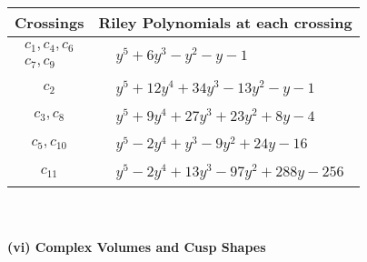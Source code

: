 \documentclass[1p]{elsarticle_modified}
\theoremstyle{definition}
\begin{document}
\begin{tabular}{m{50pt}|m{274pt}}
Crossings & \hspace{64pt}Riley Polynomials at each crossing \\
\hline $$\begin{aligned}c_{1},c_{4},c_{6}\\c_{7},c_{9}\end{aligned}$$&$\begin{aligned}
&y^5+6 y^3- y^2- y-1
\end{aligned}$\\
\hline $$\begin{aligned}c_{2}\end{aligned}$$&$\begin{aligned}
&y^5+12 y^4+34 y^3-13 y^2- y-1
\end{aligned}$\\
\hline $$\begin{aligned}c_{3},c_{8}\end{aligned}$$&$\begin{aligned}
&y^5+9 y^4+27 y^3+23 y^2+8 y-4
\end{aligned}$\\
\hline $$\begin{aligned}c_{5},c_{10}\end{aligned}$$&$\begin{aligned}
&y^5-2 y^4+y^3-9 y^2+24 y-16
\end{aligned}$\\
\hline $$\begin{aligned}c_{11}\end{aligned}$$&$\begin{aligned}
&y^5-2 y^4+13 y^3-97 y^2+288 y-256
\end{aligned}$\\
\hline
\end{tabular}\\~\\
\newpage\flushleft \textbf{(vi) Complex Volumes and Cusp Shapes}
\end{document}
